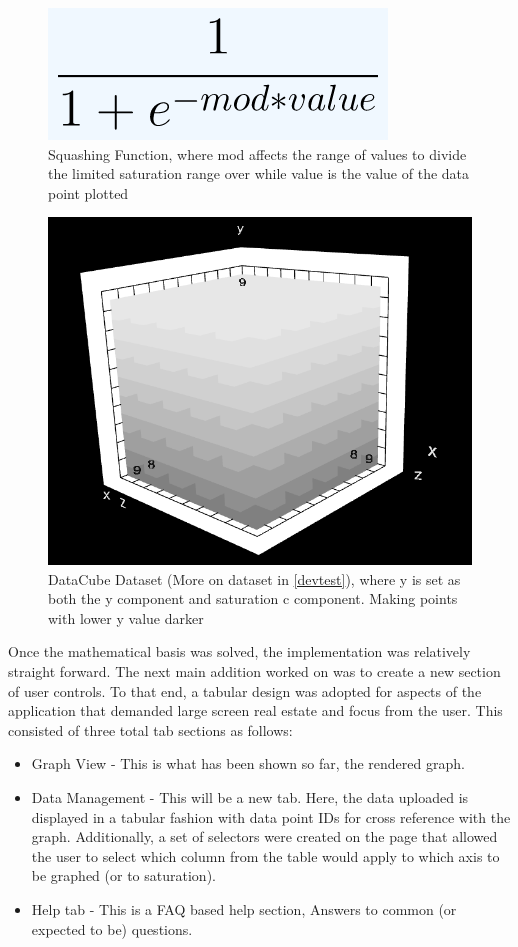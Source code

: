\begin{figure}[h]
    \centering
    \includegraphics[width=0.5\columnwidth]{author-files/figures/squashFunc.PNG}
    \caption{Squashing Function, where mod affects the range of values to divide the limited saturation range over while value is the value of the data point plotted}
    \label{fig:function}
\end{figure}

\begin{figure}[h]
    \centering
    \includegraphics[width=0.5\columnwidth]{author-files/figures/saturation.PNG}
    \caption{DataCube Dataset (More on dataset in \ref{devtest}), where y is set as both the y component and saturation c component. Making points with lower y value darker}
    \label{fig:satur}
\end{figure}

Once the mathematical basis was solved, the implementation was relatively straight forward.
The next main addition worked on was to create a new section of user controls. To that end, a tabular design was adopted for aspects of the application that demanded large screen real estate and focus from the user. This consisted of three total tab sections as follows:

\begin{itemize}
    \item Graph View - This is what has been shown so far, the rendered graph.
    \item Data Management - This will be a new tab. Here, the data uploaded is displayed in a tabular fashion with data point IDs for cross reference with the graph. Additionally, a set of selectors were created on the page that allowed the user to select which column from the table would apply to which axis to be graphed (or to saturation).
    \item Help tab - This is a FAQ based help section, Answers to common (or expected to be) questions.
\end{itemize}

